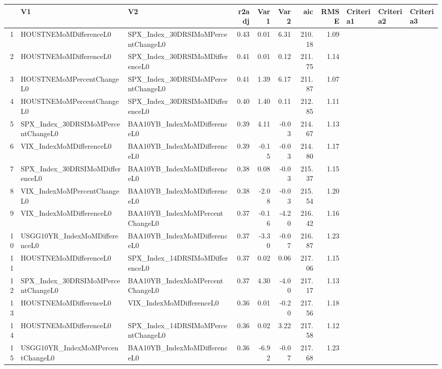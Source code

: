\begin{longtable}{rllrrrrrlll}
  \hline
 & V1 & V2 & r2adj & Var1 & Var2 & aic & RMSE & Criteria1 & Criteria2 & Criteria3 \\ 
  \hline
1 & HOUSTNEMoMDifferenceL0 & SPX\_Index\_30DRSIMoMPercentChangeL0 & 0.43 & 0.01 & 6.31 & 210.18 & 1.09 &  &  &  \\ 
  2 & HOUSTNEMoMDifferenceL0 & SPX\_Index\_30DRSIMoMDifferenceL0 & 0.41 & 0.01 & 0.12 & 211.75 & 1.14 &  &  &  \\ 
  3 & HOUSTNEMoMPercentChangeL0 & SPX\_Index\_30DRSIMoMPercentChangeL0 & 0.41 & 1.39 & 6.17 & 211.87 & 1.07 &  &  &  \\ 
  4 & HOUSTNEMoMPercentChangeL0 & SPX\_Index\_30DRSIMoMDifferenceL0 & 0.40 & 1.40 & 0.11 & 212.85 & 1.11 &  &  &  \\ 
  5 & SPX\_Index\_30DRSIMoMPercentChangeL0 & BAA10YB\_IndexMoMDifferenceL0 & 0.39 & 4.11 & -0.03 & 214.67 & 1.13 &  &  &  \\ 
  6 & VIX\_IndexMoMDifferenceL0 & BAA10YB\_IndexMoMDifferenceL0 & 0.39 & -0.15 & -0.03 & 214.80 & 1.17 &  &  &  \\ 
  7 & SPX\_Index\_30DRSIMoMDifferenceL0 & BAA10YB\_IndexMoMDifferenceL0 & 0.38 & 0.08 & -0.03 & 215.37 & 1.15 &  &  &  \\ 
  8 & VIX\_IndexMoMPercentChangeL0 & BAA10YB\_IndexMoMDifferenceL0 & 0.38 & -2.08 & -0.03 & 215.54 & 1.20 &  &  &  \\ 
  9 & VIX\_IndexMoMDifferenceL0 & BAA10YB\_IndexMoMPercentChangeL0 & 0.37 & -0.16 & -4.20 & 216.42 & 1.16 &  &  &  \\ 
  10 & USGG10YR\_IndexMoMDifferenceL0 & BAA10YB\_IndexMoMDifferenceL0 & 0.37 & -3.30 & -0.07 & 216.87 & 1.23 &  &  &  \\ 
  11 & HOUSTNEMoMDifferenceL0 & SPX\_Index\_14DRSIMoMDifferenceL0 & 0.37 & 0.02 & 0.06 & 217.06 & 1.15 &  &  &  \\ 
  12 & SPX\_Index\_30DRSIMoMPercentChangeL0 & BAA10YB\_IndexMoMPercentChangeL0 & 0.37 & 4.30 & -4.00 & 217.17 & 1.13 &  &  &  \\ 
  13 & HOUSTNEMoMDifferenceL0 & VIX\_IndexMoMDifferenceL0 & 0.36 & 0.01 & -0.20 & 217.56 & 1.18 &  &  &  \\ 
  14 & HOUSTNEMoMDifferenceL0 & SPX\_Index\_14DRSIMoMPercentChangeL0 & 0.36 & 0.02 & 3.22 & 217.58 & 1.12 &  &  &  \\ 
  15 & USGG10YR\_IndexMoMPercentChangeL0 & BAA10YB\_IndexMoMDifferenceL0 & 0.36 & -6.92 & -0.07 & 217.68 & 1.23 &  &  &  \\ 

\end{longtable}
